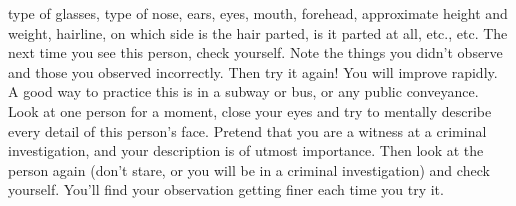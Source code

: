 \begin{itemize}
            type of glasses, type of nose, ears, eyes, mouth, forehead,
            approximate height and weight, hairline, on which side is
            the hair parted, is it parted at all, etc., etc.
                \subitem The next time
            you see this person, check yourself.
                \subitem Note the things you
            didn't observe and those you observed incorrectly. Then
            try it again! You will improve rapidly.
                \subitem A good way to practice this is in a subway or bus, or any
            public conveyance.
                \subitem Look at one person for a moment, close
            your eyes and try to mentally describe every detail of this
            person's face. Pretend that you are a witness at a criminal
            investigation, and your description is of utmost importance.
                \subitem Then look at the person again (don't stare, or you will be
            in a criminal investigation) and check yourself.
                \subitem You'll find
            your observation getting finer each time you try it.


\end{itemize}
